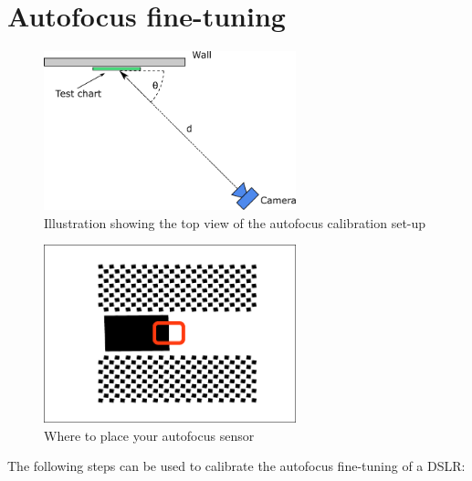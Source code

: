 \documentclass[a4paper]{article}
\begin{document}
\newpage

\section{Autofocus fine-tuning}
\label{sec:autofocus}
%
\begin{figure}[bp!]
\centering
\includegraphics[width=0.65\textwidth]{figures/af_setup}
\caption{Illustration showing the top view of the autofocus calibration
set-up}
\label{fig:af_setup}
\end{figure}
%
\begin{figure}[bp!]
\centering
\includegraphics[width=0.65\textwidth]{figures/af_sensor_placement}
\caption{Where to place your autofocus sensor}
\label{fig:af_sensor_placement}
\end{figure}
%
The following steps can be used to calibrate the autofocus fine-tuning of a
DSLR:
\end{document}
